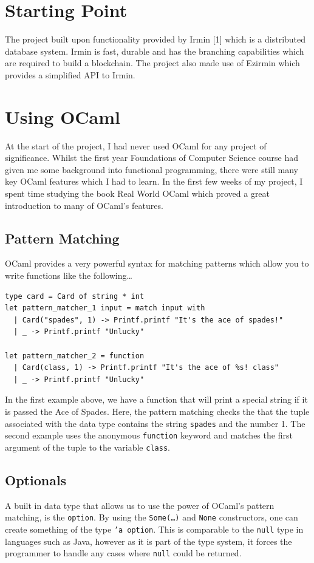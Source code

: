 \documentclass[12pt,a4paper,twoside,openright]{report}
\begin{document}
	\section{Starting Point}
		The project built upon functionality provided by Irmin [1] which is a distributed database system.  Irmin is fast, durable and has the branching capabilities which are required to build a blockchain.
		The project also made use of Ezirmin \cite{Ezirmin} which provides a simplified API to Irmin.

	\section{Using OCaml}
		At the start of the project, I had never used OCaml for any project of significance. 
		Whilst the first year Foundations of Computer Science course had given me some background into functional programming, there were still many key OCaml features which I had to learn.
		In the first few weeks of my project, I spent time studying the book Real World OCaml \cite{RealWorldOCaml} which proved a great introduction to many of OCaml's features.  

		\subsection{Pattern Matching}
		OCaml provides a very powerful syntax for matching patterns which allow you to write functions like the following\ldots 
		\begin{lstlisting}
type card = Card of string * int
let pattern_matcher_1 input = match input with 
  | Card("spades", 1) -> Printf.printf "It's the ace of spades!"
  | _ -> Printf.printf "Unlucky"
  
let pattern_matcher_2 = function 
  | Card(class, 1) -> Printf.printf "It's the ace of %s! class"
  | _ -> Printf.printf "Unlucky"
		\end{lstlisting}
		In the first example above, we have a function that will print a special string if it is passed the Ace of Spades. 
		Here, the pattern matching checks the that the tuple associated with the data type contains the string \texttt{spades} and the number 1.
		The second example uses the anonymous \texttt{function} keyword and matches the first argument of the tuple to the variable \texttt{class}.
		\subsection{Optionals}
		A built in data type that allows us to use the power of OCaml's pattern matching, is the \texttt{option}. 
		By using the \texttt{Some(\ldots)} and \texttt{None} constructors, one can create something of the type \texttt{'a option}. 
		This is comparable to the \texttt{null} type in languages such as Java, however as it is part of the type system, it forces the programmer to handle any cases where \texttt{null} could be returned.
\end{document}
